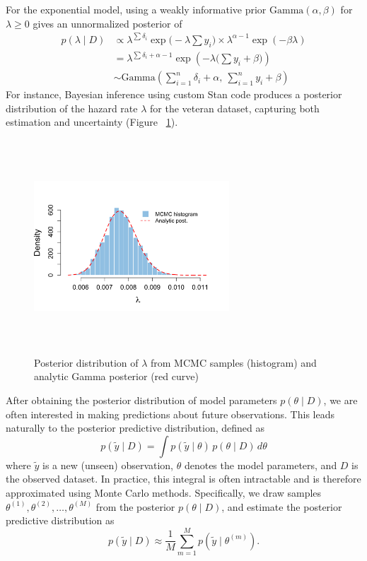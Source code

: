 For the exponential model, using a weakly informative prior $\text{Gamma}(\alpha, \beta)$ for $\lambda \ge 0$ gives an unnormalized posterior of 
\begin{align}
p(\lambda\mid D)
&\propto
\lambda^{\sum \delta_i}
\exp\Big(-\lambda \sum y_i\Big)
\times
\lambda^{\alpha - 1}
\exp(-\beta \lambda)\\
&=\lambda^{\sum \delta_i + \alpha - 1}
\exp \left( - \lambda \big(\sum y_i + \beta\big) \right) \\
&\sim
\text{Gamma}
\left(
\sum_{i=1}^{n} \delta_i + \alpha,\ \sum_{i=1}^{n} y_i + \beta
\right)
\label{eq:17}
\end{align}
For instance, Bayesian inference using custom Stan code produces a posterior distribution of the hazard rate $\lambda$ for the veteran dataset, capturing both estimation and uncertainty (Figure ~\ref{fig:exp veteran}).
\begin{figure}[H]
    \centering
    \includegraphics[height=8cm, width=0.65\textwidth]{images/veteran_post_lam.png}
    \caption{Posterior distribution of $\lambda$ from MCMC samples (histogram) and analytic Gamma posterior (red curve)}
    \label{fig:exp veteran}
\end{figure}


After obtaining the posterior distribution of model parameters $p(\theta \mid D)$, we are often interested in making predictions about future observations. This leads naturally to the posterior predictive distribution, defined as
\begin{equation}
    p(\tilde{y} \mid D) = \int p(\tilde{y} \mid \theta)\, p(\theta \mid D)\, d\theta
    \label{eq:18}
\end{equation}
where $\tilde{y}$ is a new (unseen) observation, $\theta$ denotes the model parameters, and $D$ is the observed dataset. In practice, this integral is often intractable and is therefore approximated using Monte Carlo methods. Specifically, we draw samples $\theta^{(1)}, \theta^{(2)}, \dots, \theta^{(M)}$ from the posterior $p(\theta \mid D)$, and estimate the posterior predictive distribution as
\begin{equation}
p(\tilde{y} \mid D) \approx \frac{1}{M} \sum_{m=1}^{M} p(\tilde{y} \mid \theta^{(m)}).
\end{equation}

